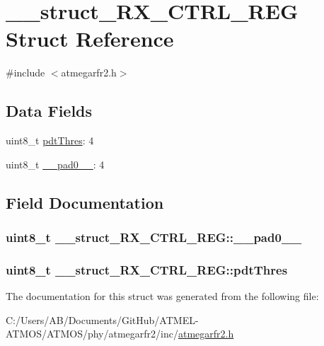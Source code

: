 \hypertarget{struct____struct___r_x___c_t_r_l___r_e_g}{\section{\-\_\-\-\_\-struct\-\_\-\-R\-X\-\_\-\-C\-T\-R\-L\-\_\-\-R\-E\-G Struct Reference}
\label{struct____struct___r_x___c_t_r_l___r_e_g}
}


{\ttfamily \#include $<$atmegarfr2.\-h$>$}

\subsection*{Data Fields}
\begin{DoxyCompactItemize}
\item 
uint8\-\_\-t \hyperlink{struct____struct___r_x___c_t_r_l___r_e_g_ad6f48f4775c8efe806abfa1afdbf8d9e}{pdt\-Thres}\-: 4
\item 
uint8\-\_\-t \hyperlink{struct____struct___r_x___c_t_r_l___r_e_g_aa5b121708328196ca960730c16a3bf8c}{\-\_\-\-\_\-pad0\-\_\-\-\_\-}\-: 4
\end{DoxyCompactItemize}


\subsection{Field Documentation}
\hypertarget{struct____struct___r_x___c_t_r_l___r_e_g_aa5b121708328196ca960730c16a3bf8c}{
\subsubsection[{\-\_\-\-\_\-pad0\-\_\-\-\_\-}]{\setlength{\rightskip}{0pt plus 5cm}uint8\-\_\-t \-\_\-\-\_\-struct\-\_\-\-R\-X\-\_\-\-C\-T\-R\-L\-\_\-\-R\-E\-G\-::\-\_\-\-\_\-pad0\-\_\-\-\_\-}}\label{struct____struct___r_x___c_t_r_l___r_e_g_aa5b121708328196ca960730c16a3bf8c}
\hypertarget{struct____struct___r_x___c_t_r_l___r_e_g_ad6f48f4775c8efe806abfa1afdbf8d9e}{
\subsubsection[{pdt\-Thres}]{\setlength{\rightskip}{0pt plus 5cm}uint8\-\_\-t \-\_\-\-\_\-struct\-\_\-\-R\-X\-\_\-\-C\-T\-R\-L\-\_\-\-R\-E\-G\-::pdt\-Thres}}\label{struct____struct___r_x___c_t_r_l___r_e_g_ad6f48f4775c8efe806abfa1afdbf8d9e}


The documentation for this struct was generated from the following file\-:\begin{DoxyCompactItemize}
\item 
C\-:/\-Users/\-A\-B/\-Documents/\-Git\-Hub/\-A\-T\-M\-E\-L-\/\-A\-T\-M\-O\-S/\-A\-T\-M\-O\-S/phy/atmegarfr2/inc/\hyperlink{atmegarfr2_8h}{atmegarfr2.\-h}\end{DoxyCompactItemize}
